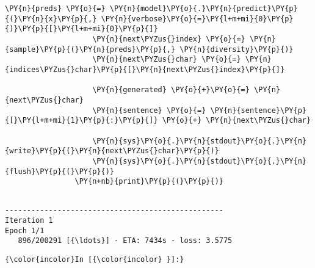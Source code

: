 \begin{Verbatim}[commandchars=\\\{\}]
                    \PY{n}{preds} \PY{o}{=} \PY{n}{model}\PY{o}{.}\PY{n}{predict}\PY{p}{(}\PY{n}{x}\PY{p}{,} \PY{n}{verbose}\PY{o}{=}\PY{l+m+mi}{0}\PY{p}{)}\PY{p}{[}\PY{l+m+mi}{0}\PY{p}{]}
                    \PY{n}{next\PYZus{}index} \PY{o}{=} \PY{n}{sample}\PY{p}{(}\PY{n}{preds}\PY{p}{,} \PY{n}{diversity}\PY{p}{)}
                    \PY{n}{next\PYZus{}char} \PY{o}{=} \PY{n}{indices\PYZus{}char}\PY{p}{[}\PY{n}{next\PYZus{}index}\PY{p}{]}
        
                    \PY{n}{generated} \PY{o}{+}\PY{o}{=} \PY{n}{next\PYZus{}char}
                    \PY{n}{sentence} \PY{o}{=} \PY{n}{sentence}\PY{p}{[}\PY{l+m+mi}{1}\PY{p}{:}\PY{p}{]} \PY{o}{+} \PY{n}{next\PYZus{}char}
        
                    \PY{n}{sys}\PY{o}{.}\PY{n}{stdout}\PY{o}{.}\PY{n}{write}\PY{p}{(}\PY{n}{next\PYZus{}char}\PY{p}{)}
                    \PY{n}{sys}\PY{o}{.}\PY{n}{stdout}\PY{o}{.}\PY{n}{flush}\PY{p}{(}\PY{p}{)}
                \PY{n+nb}{print}\PY{p}{(}\PY{p}{)}
\end{Verbatim}

    \begin{Verbatim}[commandchars=\\\{\}]

--------------------------------------------------
Iteration 1
Epoch 1/1
   896/200291 [{\ldots}] - ETA: 7434s - loss: 3.5775
    \end{Verbatim}

    \begin{Verbatim}[commandchars=\\\{\}]
{\color{incolor}In [{\color{incolor} }]:} 
\end{Verbatim}


    
    
    
    